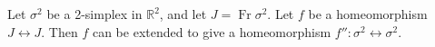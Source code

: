 Let $\sigma^2$ be a 2-simplex in $\mathbb{R}^2$, and let $J = \operatorname{Fr} \sigma^2$. Let $f$ be a homeomorphism $J \leftrightarrow J$. Then $f$ can be extended to give a homeomorphism $f'': \sigma^2 \leftrightarrow \sigma^2$.
